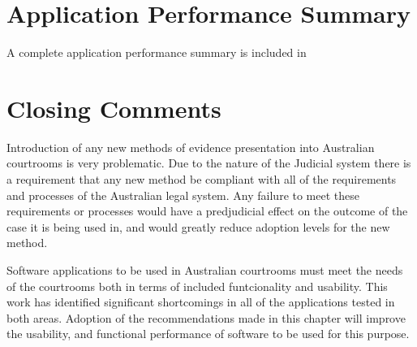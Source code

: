\section{Application Performance Summary}
A complete application performance summary is included in 

\section{Closing Comments}

Introduction of any new methods of evidence presentation into Australian courtrooms is very problematic. Due to the nature of the Judicial system there is a requirement that any new method be compliant with all of the requirements and processes of the Australian legal system. Any failure to meet these requirements or processes would have a predjudicial effect on the outcome of the case it is being used in, and would greatly reduce adoption levels for the new method.

Software applications to be used in Australian courtrooms must meet the needs of the courtrooms both in terms of included funtcionality and usability. This work has identified significant shortcomings in all of the applications tested in both areas. Adoption of the recommendations made in this chapter will improve the usability, and functional performance of software to be used for this purpose.




